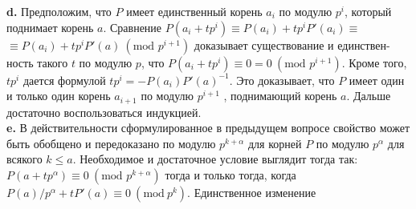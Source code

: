 \hspace*{15pt}\textbf{d.} Предположим, что $P$ имеет единственный корень $a_i$ по модулю $p^i$,\linebreak
который поднимает корень $a$. Сравнение $P(a_i+tp^i)\equiv P(a_i)+tp^i P'(a_i)\equiv$\linebreak
$\equiv P(a_i)+tp^iP'(a)~(\text{mod }p^{i+1})$ доказывает существование и единствен-\linebreak
ность такого $t$ по модулю $p$, что $P(a_i+tp^i)\equiv0 = 0 ~(\text{mod }p^{i+1})$. Кроме\linebreak
того, $tp^i$ дается формулой $tp^i=-P(a_i)P'(a)^{-1}$. Это доказывает, что $P$\linebreak
имеет один и только один корень $a_{i+1}$ по модулю $p^{i+1}$ , поднимающий\linebreak
корень $a$. Дальше достаточно воспользоваться индукцией.\newline
\\
\hspace*{15pt}\textbf{e.} В действительности сформулированное в предыдущем вопросе\linebreak
свойство может быть обобщено и передоказано по модулю $p^{k+\alpha}$ для\linebreak
корней $P$ по модулю $p^\alpha$ для всякого $k\leqslant a$. Необходимое и достаточное\linebreak
условие выглядит тогда так: $P(a+tp^\alpha)\equiv 0~(\text{mod }p^{k+\alpha})$ тогда и только\linebreak
тогда, когда $P(a)/p^\alpha+tP'(a)\equiv0~(\text{mod}~p^k)$. Единственное изменение\linebreak

\pagebreak
